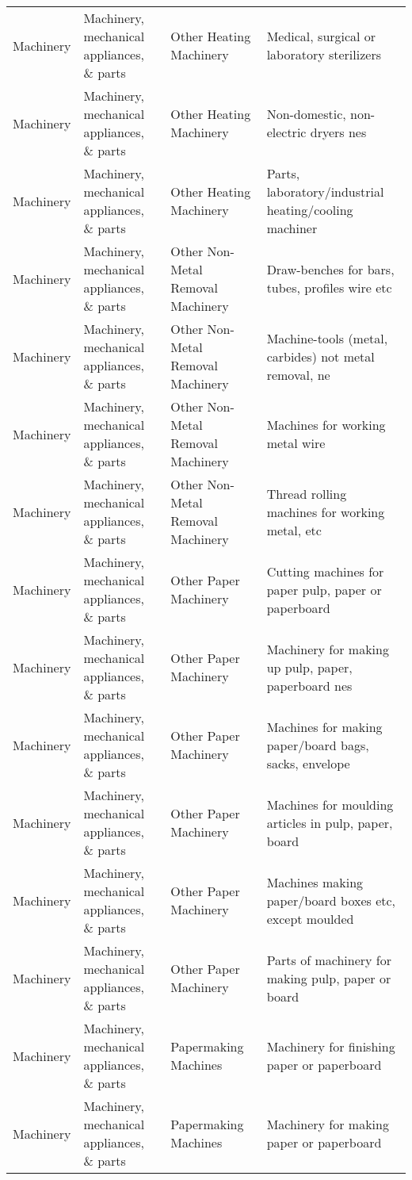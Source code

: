 \begin{appendices}
\begin{xltabular}{\textwidth}{|p{0.07\textwidth}|p{0.25\textwidth}|p{0.28\textwidth}|p{0.3\textwidth}|}
		Machinery & Machinery, mechanical appliances, \& parts & Other Heating Machinery & Medical, surgical or laboratory sterilizers \\
		Machinery & Machinery, mechanical appliances, \& parts & Other Heating Machinery & Non-domestic, non-electric dryers nes \\
		Machinery & Machinery, mechanical appliances, \& parts & Other Heating Machinery & Parts, laboratory/industrial heating/cooling machiner \\
		Machinery & Machinery, mechanical appliances, \& parts & Other Non-Metal Removal Machinery & Draw-benches for bars, tubes, profiles wire etc \\
		Machinery & Machinery, mechanical appliances, \& parts & Other Non-Metal Removal Machinery & Machine-tools (metal, carbides) not metal removal, ne \\
		Machinery & Machinery, mechanical appliances, \& parts & Other Non-Metal Removal Machinery & Machines for working metal wire \\
		Machinery & Machinery, mechanical appliances, \& parts & Other Non-Metal Removal Machinery & Thread rolling machines for working metal, etc \\
		Machinery & Machinery, mechanical appliances, \& parts & Other Paper Machinery & Cutting machines for paper pulp, paper or paperboard \\
		Machinery & Machinery, mechanical appliances, \& parts & Other Paper Machinery & Machinery for making up pulp, paper, paperboard nes \\
		Machinery & Machinery, mechanical appliances, \& parts & Other Paper Machinery & Machines for making paper/board bags, sacks, envelope \\
		Machinery & Machinery, mechanical appliances, \& parts & Other Paper Machinery & Machines for moulding articles in pulp, paper, board \\
		Machinery & Machinery, mechanical appliances, \& parts & Other Paper Machinery & Machines making paper/board boxes etc, except moulded \\
		Machinery & Machinery, mechanical appliances, \& parts & Other Paper Machinery & Parts of machinery for making pulp, paper or board \\
		Machinery & Machinery, mechanical appliances, \& parts & Papermaking Machines & Machinery for finishing paper or paperboard \\
		Machinery & Machinery, mechanical appliances, \& parts & Papermaking Machines & Machinery for making paper or paperboard \\

\end{xltabular}
\end{appendices}
